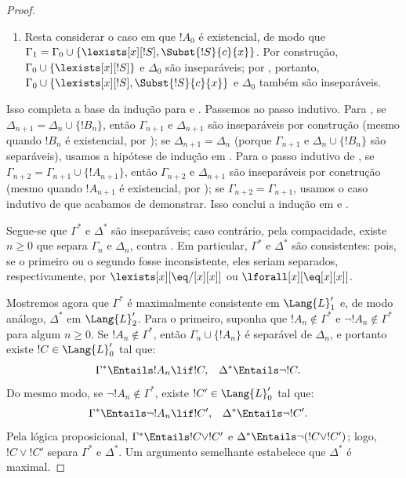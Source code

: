 \documentclass[../../../include/open-logic-section]{subfiles}
\begin{document}
\begin{proof}
\begin{enumerate}
\item Resta considerar o caso em que $!A_0$ é existencial, de modo que
  $\Gamma_1 = \Gamma_0 \cup \{ \lexists[x][!S], \Subst{!S}{c}{x}
  \}$. Por construção, $\Gamma_0 \cup \{ \lexists[x][!S]\}$ e
  $\Delta_0$ são inseparáveis; por , portanto,
  $\Gamma_0 \cup \{ \lexists[x][!S], \Subst{!S}{c}{x} \}$ e
  $\Delta_0$ também são inseparáveis.
\end{enumerate}
Isso completa a base da indução para  e
. Passemos ao passo indutivo. Para , se
$\Delta_{n+1} = \Delta_n \cup \{ !B_n \}$, então $\Gamma_{n+1}$ e
$\Delta_{n+1}$ são inseparáveis por construção (mesmo quando $!B_n$ é
existencial, por ); se
$\Delta_{n+1} = \Delta_n$ (porque $\Gamma_{n+1}$ e
$\Delta_n \cup \{!B_n\}$ são separáveis), usamos a hipótese de indução
em . Para o passo indutivo de , se
$\Gamma_{n+2} = \Gamma_{n+1} \cup \{!A_{n+1} \}$, então
$\Gamma_{n+2}$ e $\Delta_{n+1}$ são inseparáveis por construção (mesmo
quando $!A_{n+1}$ é existencial, por ); se
$\Gamma_{n+2} = \Gamma_{n+1}$, usamos o caso indutivo de
 que acabamos de demonstrar. Isso conclui a indução em
 e .

Segue-se que $\Gamma^*$ e $\Delta^*$ são inseparáveis; caso contrário,
pela compacidade, existe $n \ge 0$ que separa $\Gamma_n$ e $\Delta_n$,
contra . Em particular, $\Gamma^*$ e $\Delta^*$ são
consistentes: pois, se o primeiro ou o segundo fosse inconsistente,
eles seriam separados, respectivamente, por
$\lexists[x][\eq/[x][x]]$ ou $\lforall[x][\eq[x][x]]$.

Mostremos agora que $\Gamma^*$ é maximalmente consistente em
$\Lang{L}'_1$ e, de modo análogo, $\Delta^*$ em $\Lang{L}'_2$. Para o
primeiro, suponha que $!A_n \notin \Gamma^*$ e
$\lnot !A_n \notin \Gamma^*$ para algum $n \ge 0$. Se
$!A_n \notin \Gamma^*$, então $\Gamma_n \cup \{!A_n \}$ é separável de
$\Delta_n$, e portanto existe $!C \in \Lang{L}'_0$ tal que:
\begin{align*}
  \Gamma^* & \Entails !A_n \lif !C, & 
  \Delta^* & \Entails \lnot !C.
\end{align*}
Do mesmo modo, se $\lnot !A_n \notin \Gamma^*$, existe
$!C' \in \Lang{L}'_0$ tal que:
\begin{align*}
  \Gamma^* & \Entails \lnot !A_n \lif !C', & 
  \Delta^* & \Entails \lnot !C'.
\end{align*}
Pela lógica proposicional, $\Gamma^* \Entails !C \lor !C'$ e
$\Delta^* \Entails \lnot (!C \lor !C')$; logo, $!C \lor !C'$ separa
$\Gamma^*$ e $\Delta^*$. Um argumento semelhante estabelece que
$\Delta^*$ é maximal.


\end{proof}
\end{document}
